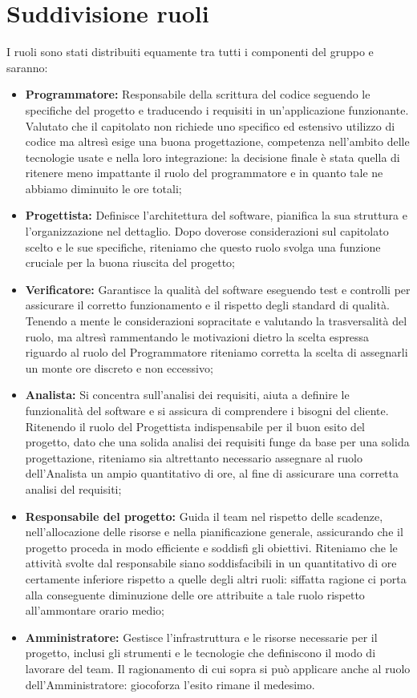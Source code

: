 \documentclass[8pt]{article}
\begin{document}
\section{Suddivisione ruoli}
I ruoli sono stati distribuiti equamente tra tutti i componenti del gruppo e saranno:
\begin{itemize}
	\item \textbf{Programmatore:} Responsabile della scrittura del codice seguendo le specifiche del progetto e traducendo i requisiti in un'applicazione funzionante. Valutato che il capitolato non richiede uno specifico ed estensivo utilizzo di codice
	ma altresì esige una buona progettazione, competenza nell'ambito delle tecnologie usate e nella loro integrazione: la decisione finale è stata quella di ritenere meno impattante il ruolo del programmatore e in quanto tale ne abbiamo diminuito le ore totali;
	\item \textbf{Progettista:} Definisce l'architettura del software, pianifica la sua struttura e l'organizzazione nel dettaglio. Dopo doverose considerazioni sul capitolato scelto e le sue specifiche, riteniamo che questo ruolo svolga una funzione cruciale per la buona riuscita del progetto;
	\item \textbf{Verificatore:} Garantisce la qualità del software eseguendo test e controlli per assicurare il corretto funzionamento e il rispetto degli standard di qualità. Tenendo a mente le considerazioni sopracitate e valutando la trasversalità del ruolo, ma altresì rammentando le motivazioni dietro la scelta espressa riguardo al ruolo del Programmatore riteniamo corretta la scelta di assegnarli un monte ore discreto e non eccessivo;
	\item \textbf{Analista:} Si concentra sull'analisi dei requisiti, aiuta a definire le funzionalità del software e si assicura di comprendere i bisogni del cliente. Ritenendo il ruolo del Progettista indispensabile per il buon esito del progetto, dato che una solida analisi dei requisiti funge da base per una solida progettazione, riteniamo sia altrettanto necessario assegnare al ruolo dell'Analista un ampio quantitativo di ore, al fine di assicurare una corretta analisi del requisiti;
	\item \textbf{Responsabile del progetto:} Guida il team nel rispetto delle scadenze, nell'allocazione delle risorse e nella pianificazione generale, assicurando che il progetto proceda in modo efficiente e soddisfi gli obiettivi. Riteniamo che le attività svolte dal responsabile siano soddisfacibili in un quantitativo di ore certamente inferiore rispetto a quelle degli altri ruoli: siffatta ragione ci porta alla conseguente diminuzione delle ore attribuite a tale ruolo rispetto all'ammontare orario medio;
	\item \textbf{Amministratore:} Gestisce l'infrastruttura e le risorse necessarie per il progetto, inclusi gli strumenti e le tecnologie che definiscono il modo di lavorare del team. Il ragionamento di cui sopra si può applicare anche al ruolo dell'Amministratore: giocoforza l'esito rimane il medesimo.	
\end{itemize}
\newpage
\end{document}
